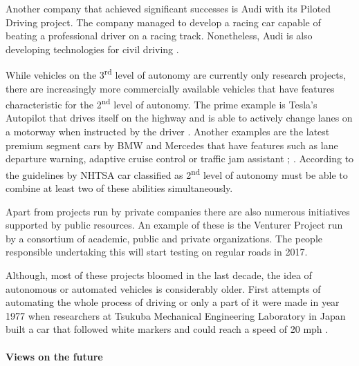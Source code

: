 \documentclass[11pt,english]{article}
\begin{document}
\par
Another company that achieved significant successes is Audi with its Piloted Driving project. The company managed to develop a racing car capable of beating a professional driver on a racing track. Nonetheless, Audi is also developing technologies for civil driving \citep{audi1}.

\par


While vehicles on the 3\textsuperscript{rd} level of autonomy are currently only research projects, there are increasingly more commercially available vehicles that have features characteristic for the 2\textsuperscript{nd} level of autonomy. The prime example is Tesla's Autopilot that drives itself on the highway and is able to actively change lanes on a motorway when instructed by the driver \citep{tesla2}. Another examples are the latest premium segment cars by BMW and Mercedes that have features such as lane departure warning, adaptive cruise control or traffic jam assistant \citep{bmw}; \citep{mercedes1}. According to the guidelines by NHTSA car classified as 2\textsuperscript{nd} level of autonomy must be able to combine at least two of these abilities simultaneously.


\par

Apart from projects run by private companies there are also numerous initiatives supported by public resources. An example of these is the Venturer Project run by a consortium of academic, public and private  organizations. The people responsible undertaking this will start testing on regular roads in 2017.

\par
Although, most of these projects bloomed in the last decade, the idea of autonomous or automated vehicles is considerably older. First attempts of automating the whole process of driving or only a part of it were made in year 1977 when researchers at Tsukuba Mechanical Engineering Laboratory in Japan built a car that followed white markers and could reach a speed of 20 mph \citep{forrest2007autonomous}.





\paragraph{Views on the future}
\end{document}
